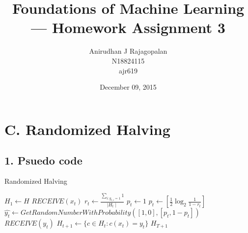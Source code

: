 \documentclass{article}
\begin{document}
\title{Foundations of Machine Learning --- Homework Assignment 3}
\date{December 09, 2015}
\author{Anirudhan J Rajagopalan\\ N18824115\\ ajr619}

\maketitle

\newpage

\section*{C. Randomized Halving}
\subsection*{1. Psuedo code}

\begin{algorithm}
  \caption{Randomized Halving}\label{euclid}
  \begin{algorithmic}[1]
    \State{} $ H_{1} \gets H$
    \State{} $RECEIVE(x_{t})$
    \State{} \( r_{t} \gets{} \frac{\sum_{i:y_{t,i} = 1} 1}{\mid H_{t} \mid}  \)
    \State{} \( p_{t} \gets{} 1 \)
    \State{} \( p_{t} \gets{} [\frac{1}{2} \log_2{\frac{1}{1- r_{t}}} ] \)
    \EndIf{}
    \State{} \( \hat{y_{t}} \gets{} GetRandomNumberWithProbability([1, 0], [p_{t}, 1-p_{t}]) \)
    \State{} $RECEIVE(y_{t})$
    \State{} \( H_{t+1}  \gets{} \{ c \in H_{t}: c(x_{t}) = y_{t} \}\)
    \EndIf{}
    \EndFor{}
    \Return{} $H_{T+1} $
  \end{algorithmic}
\end{algorithm}
\end{document}
